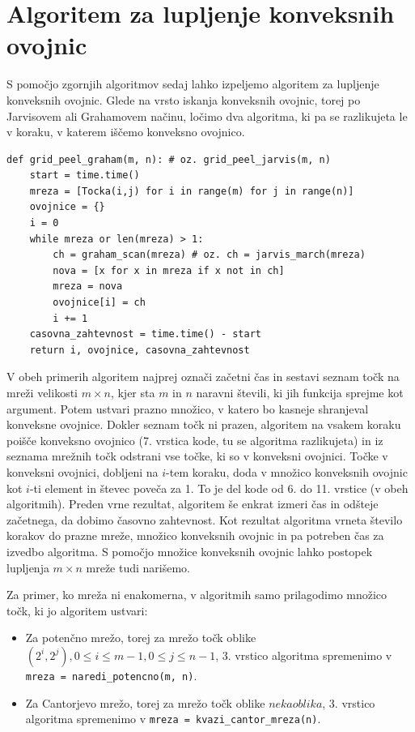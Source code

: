 \documentclass[a4paper]{article}
\begin{document}
\section{Algoritem za lupljenje konveksnih ovojnic}
S pomočjo zgornjih algoritmov sedaj lahko izpeljemo algoritem za lupljenje konveksnih ovojnic. Glede na vrsto iskanja konveksnih ovojnic, torej po Jarvisovem ali 
Grahamovem načinu, ločimo dva algoritma, ki pa se razlikujeta le v koraku, v katerem iščemo konveksno ovojnico.

\begin{lstlisting}
def grid_peel_graham(m, n): # oz. grid_peel_jarvis(m, n)
    start = time.time()
    mreza = [Tocka(i,j) for i in range(m) for j in range(n)]
    ovojnice = {}
    i = 0
    while mreza or len(mreza) > 1:
        ch = graham_scan(mreza) # oz. ch = jarvis_march(mreza)
        nova = [x for x in mreza if x not in ch]
        mreza = nova
        ovojnice[i] = ch
        i += 1
    casovna_zahtevnost = time.time() - start 
    return i, ovojnice, casovna_zahtevnost
\end{lstlisting}

V obeh primerih algoritem najprej označi začetni čas in sestavi seznam točk na mreži velikosti $m \times n$, kjer sta $m$ in $n$ naravni števili, ki jih funkcija sprejme kot argument. 
Potem ustvari prazno množico, v katero bo kasneje shranjeval konveksne ovojnice. Dokler seznam točk ni prazen, algoritem na vsakem koraku poišče konveksno ovojnico (7. vrstica kode, 
tu se algoritma razlikujeta) in iz seznama mrežnih točk odstrani vse točke, ki so v konveksni ovojnici. Točke v konveksni ovojnici, dobljeni na $i$-tem koraku, doda v množico konveksnih 
ovojnic kot $i$-ti element in števec poveča za 1. To je del kode od 6. do 11. vrstice (v obeh algoritmih). Preden vrne rezultat, algoritem še enkrat izmeri čas in odšteje začetnega, da 
dobimo časovno zahtevnost. Kot rezultat algoritma vrneta število korakov do prazne mreže, množico konveksnih ovojnic in pa potreben čas za izvedbo algoritma. S pomočjo množice konveksnih 
ovojnic lahko postopek lupljenja $m \times n$ mreže tudi narišemo.

Za primer, ko mreža ni enakomerna, v algoritmih samo prilagodimo množico točk, ki jo algoritem ustvari:

\begin{itemize}
    \item {Za potenčno mrežo, torej za mrežo točk oblike $(2^i, 2^j), 0 \leq i \leq m-1, 0 \leq j \leq n-1$, 3. vrstico algoritma spremenimo v \lstinline{mreza = naredi_potencno(m, n)}.}
    \item {Za Cantorjevo mrežo, torej za mrežo točk oblike $neka oblika$, 3. vrstico algoritma spremenimo v \lstinline{mreza = kvazi_cantor_mreza(n)}.}
\end{itemize}
\end{document}
